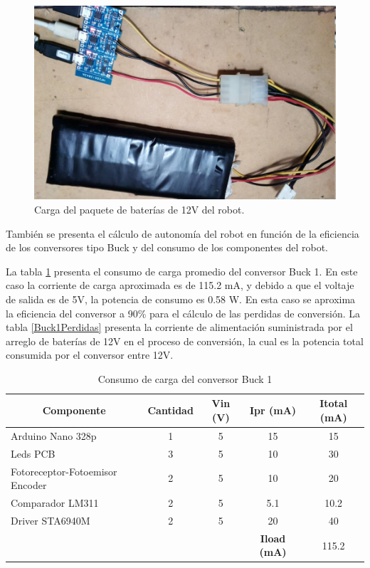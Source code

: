 \begin{figure}[H]
	\centering	
	\includegraphics[width=0.7\linewidth]{imagenes/prototipo/Bateria}
	\caption[Proceso de carga de baterías]{Carga del paquete de baterías de 12V del robot.}
	\label{imagen:Bateria}
\end{figure}

También se presenta el cálculo de autonomía del robot en función de la eficiencia de los conversores tipo Buck y del consumo de los componentes del robot.

La tabla \ref{Buck1} presenta el consumo de carga promedio del conversor Buck 1. En este caso la corriente de carga aproximada es de 115.2 mA, y debido a que el voltaje de salida es de 5V, la potencia de consumo es 0.58 W. En esta caso se aproxima la eficiencia del conversor a 90\% para el cálculo de las perdidas de conversión. La tabla \ref{Buck1Perdidas} presenta la corriente de alimentación suministrada por el arreglo de baterías de 12V en el proceso de conversión, la cual es la potencia total consumida por el conversor entre 12V.

\begin{table}[htbp]
	\caption{Consumo de carga del conversor Buck 1}
	\centering
	\begin{tabular}{|l|c|c|c|c|}
		\hline
		\multicolumn{1}{|c|}{\textbf{Componente}} & \textbf{Cantidad} & \textbf{ Vin (V)} & \textbf{ Ipr (mA)} & \textbf{Itotal (mA)} \\ \hline
		Arduino Nano 328p & 1 & 5 & 15 & 15 \\ \hline
		Leds PCB & 3 & 5 & 10 & 30 \\ \hline
		Fotoreceptor-Fotoemisor Encoder & 2 & 5 & 10 & 20 \\ \hline
		Comparador LM311 & 2 & 5 & 5.1 & 10.2 \\ \hline
		Driver STA6940M & 2 & 5 & 20 & 40 \\ \hline
		& \multicolumn{1}{l|}{} & \multicolumn{1}{l|}{} & \textbf{Iload (mA)} & 115.2 \\ \hline
	\end{tabular}
	\label{Buck1}
\end{table}



